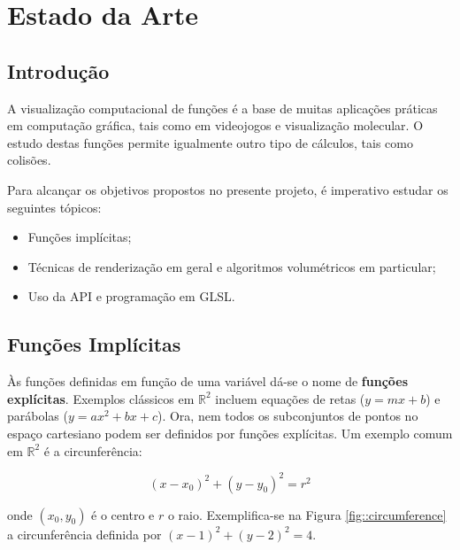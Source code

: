 \chapter{Estado da Arte}
\label{ch::arte}

\section{Introdução}
\label{sec::arte:intro}

A visualização computacional de funções é a base de muitas aplicações práticas em computação gráfica, tais como em videojogos e visualização molecular. O estudo destas funções permite igualmente outro tipo de cálculos, tais como colisões.

Para alcançar os objetivos propostos no presente projeto, é imperativo estudar os seguintes tópicos:

\begin{itemize}
	\item Funções implícitas;
	\item Técnicas de renderização em geral e algoritmos volumétricos em particular;
	\item Uso da \ac{API} \opengl e programação em \ac{GLSL}.
\end{itemize}


\section{Funções Implícitas}
\label{sec::arte:implicitas}



Às funções definidas em função de uma variável dá-se o nome de \textbf{funções explícitas}. Exemplos clássicos em $\mathbb{R}^2$ incluem equações de retas ($y = mx + b$) e parábolas ($y = ax^2 + bx + c$). Ora, nem todos os subconjuntos de pontos no espaço cartesiano podem ser definidos por funções explícitas. Um exemplo comum em $\mathbb{R}^2$ é a circunferência:

\begin{equation}
	(x - x_0)^2 + (y - y_0)^2 = r^2
	\label{eq::circ_implicita}
\end{equation}

onde $(x_0, y_0)$ é o centro e $r$ o raio. Exemplifica-se na Figura \ref{fig::circumference} a circunferência definida por $(x - 1)^2 + (y - 2)^2 = 4$.

